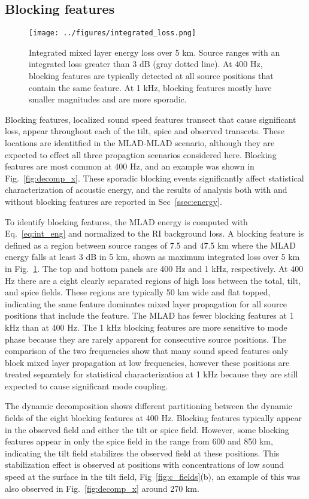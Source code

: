 \documentclass[preprint,NumberedRefs]{JASA}
\begin{document}
\subsection{Blocking features}\label{ssec:blocking}
\begin{figure}
\texttt{[image: ../figures/integrated\_loss.png]}
    \caption{Integrated mixed layer energy loss over 5 km. Source ranges with an integrated loss greater than 3 dB (gray dotted line). At 400 Hz, blocking features are typically detected at all source positions that contain the same feature. At 1 kHz, blocking features mostly have smaller magnitudes and are more sporadic.}
    \label{fig:blocking}
\end{figure}

Blocking features, localized sound speed features transect that cause significant loss, appear throughout each of the tilt, spice and observed transcets. These locations are identitfied in the MLAD-MLAD scenario, although they are expected to effect all three propagtion scenarios considered here. Blocking features are most common at 400 Hz, and an example was shown in Fig.~\ref{fig:decomp_x}. These sporadic blocking events significantly affect statistical characterization of acoustic energy, and the results of analysis both with and without blocking features are reported in Sec~\ref{ssec:energy}.

To identify blocking features, the MLAD energy is computed with Eq.~\eqref{eq:int_eng} and normalized to the RI background loss. A blocking feature is defined as a region between source ranges of 7.5 and 47.5 km where the MLAD energy falls at least 3 dB in 5 km, shown as maximum integrated loss over 5 km in Fig.~\ref{fig:blocking}. The top and bottom panels are 400 Hz and 1 kHz, respectively. At 400 Hz there are a eight clearly separated regions of high loss between the total, tilt, and spice fields. These regions are typically 50 km wide and flat topped, indicating the same feature dominates mixed layer propagation for all source positions that include the feature. The MLAD has fewer blocking features at 1 kHz than at 400 Hz. The 1 kHz blocking features are more sensitive to mode phase because they are rarely apparent for consecutive source positions. The comparison of the two frequencies show that many sound speed features only block mixed layer propagation at low frequencies, however these positions are treated separately for statistical characterization at 1 kHz because they are still expected to cause significant mode coupling.

The dynamic decomposition shows different partitioning between the dynamic fields of the eight blocking features at 400 Hz. Blocking features typically appear in the observed field and either the tilt or spice field. However, some blocking features appear in only the spice field in the range from 600 and 850 km, indicating the tilt field stabilizes the observed field at these positions. This stabilization effect is observed at positions with concentrations of low sound speed at the surface in the tilt field, Fig~\ref{fig:c_fields}(b), an example of this was also observed in Fig.~\ref{fig:decomp_x} around 270 km.
\end{document}
